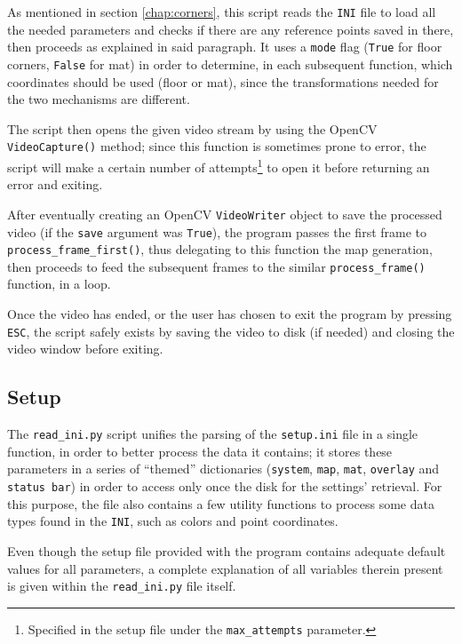 \documentclass[12pt]{article}
\begin{document}
As mentioned in section \ref{chap:corners}, this script reads the \lstinline{INI} file to load all the needed parameters and checks if there are any reference points saved in there, then proceeds as explained in said paragraph. It uses a \lstinline{mode} flag (\lstinline{True} for floor corners, \lstinline{False} for mat) in order to determine, in each subsequent function, which coordinates should be used (floor or mat), since the transformations needed for the two mechanisms are different.

The script then opens the given video stream by using the OpenCV \lstinline{VideoCapture()} method\cite{cvcamera}; since this function is sometimes prone to error, the script will make a certain number of attempts\footnote{Specified in the setup file under the \lstinline{max_attempts} parameter.} to open it before returning an error and exiting.

After eventually creating an OpenCV \lstinline{VideoWriter} object to save the processed video (if the \lstinline{save} argument was \lstinline{True}), the program passes the first frame to \lstinline{process_frame_first()}, thus delegating to this function the map generation, then proceeds to feed the subsequent frames to the similar \lstinline{process_frame()} function, in a loop.

Once the video has ended, or the user has chosen to exit the program by pressing \lstinline{ESC}, the script safely exists by saving the video to disk (if needed) and closing the video window before exiting.


\subsection{Setup}
\label{chap:setup}
The \lstinline{read_ini.py} script unifies the parsing of the \lstinline{setup.ini} file in a single function, in order to better process the data it contains; it stores these parameters in a series of “themed” dictionaries (\lstinline{system}, \lstinline{map}, \lstinline{mat}, \lstinline{overlay} and \lstinline{status bar}) in order to access only once the disk for the settings' retrieval. For this purpose, the file also contains a few utility functions to process some data types found in the \lstinline{INI}, such as colors and point coordinates.

Even though the setup file provided with the program contains adequate default values for all parameters, a complete explanation of all variables therein present is given within the \lstinline{read_ini.py} file itself.
\end{document}
